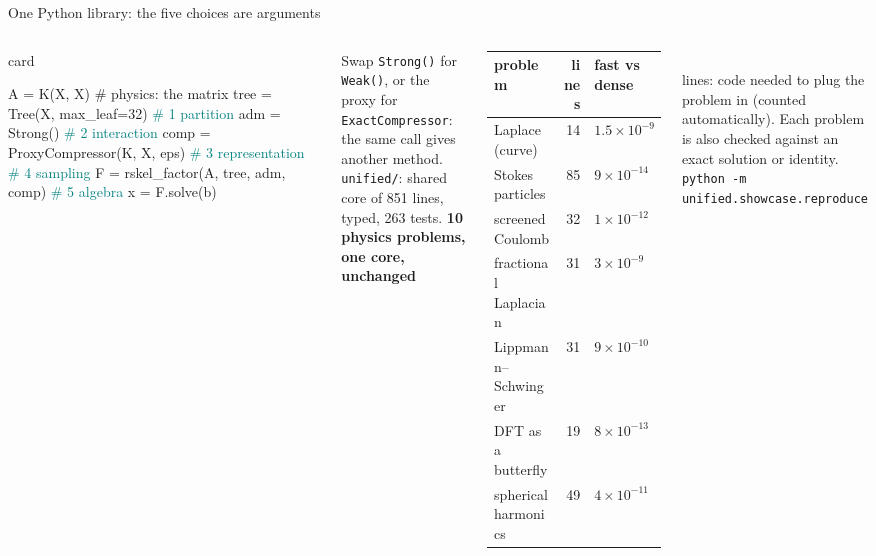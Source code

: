 \documentclass[aspectratio=169,10pt,t]{beamer}
\begin{document}
\begin{frame}[fragile]{One Python library: the five choices are arguments}\label{s:lib}
\begin{columns}[T,onlytextwidth]
\begin{beamercolorbox}[rounded=true,sep=1ex]{card}
\scriptsize
\begin{semiverbatim}A    = K(X, X)                \textcolor{muted}{\# physics: the matrix}
tree = Tree(X, max_leaf=32)   \textcolor{teal}{\# 1 partition}
adm  = Strong()               \textcolor{teal}{\# 2 interaction}
comp = ProxyCompressor(K, X, eps)
                              \textcolor{teal}{\# 3 representation}
                              \textcolor{teal}{\# 4 sampling}
F    = rskel_factor(A, tree, adm, comp)
                              \textcolor{teal}{\# 5 algebra}
x    = F.solve(b)
\end{semiverbatim}
\end{beamercolorbox}
\vspace{1mm}
\scriptsize Swap \texttt{Strong()} for \texttt{Weak()}, or the proxy for \texttt{ExactCompressor}: the same call gives another method.\\[1mm]
{\color{muted}\texttt{unified/}: shared core of 851 lines, typed, 263 tests.}
\footnotesize\textbf{10 physics problems, one core, unchanged}\\[1mm]
\scriptsize
\renewcommand{\arraystretch}{1.15}
\begin{tabular}{@{}L{2.9cm}rl@{}}
\toprule
problem & lines & fast vs dense\\
\midrule
Laplace (curve) & 14 & $1.5\times10^{-9}$\\
Stokes particles & 85 & $9\times10^{-14}$\\
screened Coulomb & 32 & $1\times10^{-12}$\\
fractional Laplacian & 31 & $3\times10^{-9}$\\
Lippmann--Schwinger & 31 & $9\times10^{-10}$\\
DFT as a butterfly & 19 & $8\times10^{-13}$\\
spherical harmonics & 49 & $4\times10^{-11}$\\
\bottomrule
\end{tabular}\\[1mm]
{\color{muted}lines: code needed to plug the problem in (counted automatically). Each problem is also checked against an exact solution or identity.}\\[1mm]
\texttt{python -m unified.showcase.reproduce}
\end{columns}
\end{frame}
\end{document}
